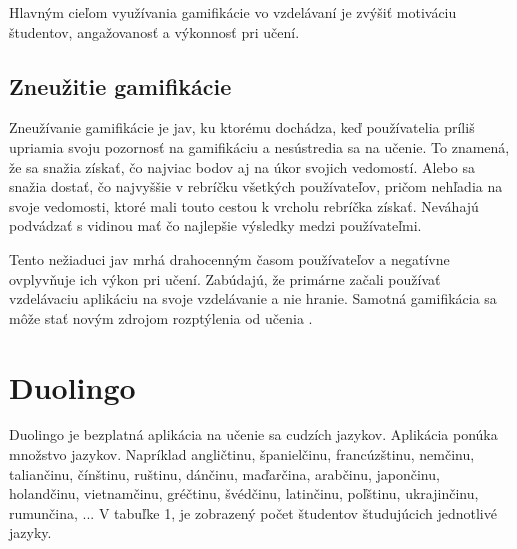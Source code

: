 \documentclass[10pt,twoside,slovak,a4paper]{article}
\begin{document}
Hlavným cieľom využívania gamifikácie vo vzdelávaní je zvýšiť motiváciu študentov, angažovanosť a výkonnosť pri učení\cite{HadiMogavi2022}. 

\subsection{Zneužitie gamifikácie} \label{Čo je to gamifikácia?:Zneužitie gamifikácie}

Zneužívanie gamifikácie je jav, ku ktorému dochádza, keď používatelia príliš upriamia svoju pozornosť na gamifikáciu a nesústredia sa na učenie\cite{HadiMogavi2022}. To znamená, že sa snažia získať, čo najviac bodov aj na úkor svojich vedomostí. Alebo sa snažia dostať, čo najvyššie v rebríčku všetkých používateľov, pričom nehľadia na svoje vedomosti, ktoré mali touto cestou k vrcholu rebríčka získať. Neváhajú podvádzať s vidinou mať čo najlepšie výsledky medzi používateľmi.

Tento nežiaduci jav mrhá drahocenným časom používateľov a negatívne ovplyvňuje ich výkon pri učení\cite{HadiMogavi2022}. Zabúdajú, že primárne začali používať vzdelávaciu aplikáciu na svoje vzdelávanie a nie hranie. Samotná gamifikácia sa môže stať novým zdrojom rozptýlenia od učenia \cite{negativegamification}.

%

\section{Duolingo} \label{Duolingo}
Duolingo je bezplatná aplikácia na učenie sa cudzích jazykov. Aplikácia ponúka množstvo jazykov. Napríklad angličtinu, španielčinu, francúzštinu, nemčinu, taliančinu, čínštinu, ruštinu, dánčinu, maďarčina, arabčinu, japončinu, holandčinu, vietnamčinu, gréčtinu, švédčinu, latinčinu, poľštinu, ukrajinčinu, rumunčina, ...\cite{Duoplanet} V tabuľke 1, je zobrazený počet študentov študujúcich jednotlivé jazyky.

\end{document}
